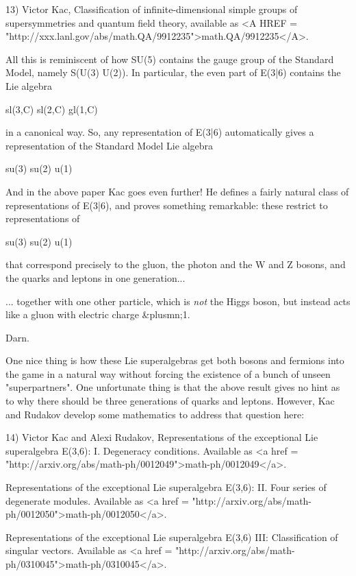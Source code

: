 13) Victor Kac, Classification of infinite-dimensional simple 
groups of supersymmetries and quantum field theory, available as 
<A HREF = "http://xxx.lanl.gov/abs/math.QA/9912235">math.QA/9912235</A>.

All this is reminiscent of how SU(5) contains the gauge group of 
the Standard Model, namely S(U(3) \times  U(2)).  In particular, the 
even part of E(3|6) contains the Lie algebra

sl(3,C) \oplus  sl(2,C) \oplus  gl(1,C)

in a canonical way.  So, any representation of E(3|6) automatically 
gives a representation of the Standard Model Lie algebra

su(3) \oplus  su(2) \oplus  u(1)

And in the above paper Kac goes even further!  He defines a fairly
natural class of representations of E(3|6), and proves something 
remarkable: these restrict to representations of 

su(3) \oplus  su(2) \oplus  u(1) 

that correspond precisely to the gluon, the photon and the W and 
Z bosons, and the quarks and leptons in one generation...

... together with one other particle, which is \emph{not} the Higgs 
boson, but instead acts like a gluon with electric charge &plusmn;1.  

Darn.  

One nice thing is how these Lie superalgebras get both bosons and 
fermions into the game in a natural way without forcing the 
existence of a bunch of unseen "superpartners".  One unfortunate 
thing is that the above result gives no hint as to why there 
should be three generations of quarks and leptons.  However, Kac 
and Rudakov develop some mathematics to address that question 
here:

14) Victor Kac and Alexi Rudakov, Representations of the 
exceptional Lie superalgebra E(3,6): I. Degeneracy conditions.  
Available as <a href = "http://arxiv.org/abs/math-ph/0012049">math-ph/0012049</a>.

Representations of the exceptional Lie superalgebra E(3,6): II. 
Four series of degenerate modules.  Available as <a href = "http://arxiv.org/abs/math-ph/0012050">math-ph/0012050</a>.

Representations of the exceptional Lie superalgebra E(3,6) 
III: Classification of singular vectors.  Available as 
<a href = "http://arxiv.org/abs/math-ph/0310045">math-ph/0310045</a>.

